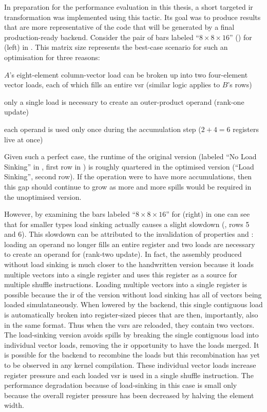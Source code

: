 \documentclass[\main/thesis.tex]{subfiles}
\begin{document}
In preparation for the performance evaluation in this thesis, a short targeted \gls{ir} transformation was implemented using this tactic.
Its goal was to produce results that are more representative of the code that will be generated by a final production-ready backend.
Consider the pair of bars labeled ``$8 \times 8 \times 16$'' () for  (left) in .
This matrix size represents the best-case scenario for such an optimisation for three reasons:
\begin{enumerate*}[itemjoin={{; }}, itemjoin*={{; and }}, label={\protect\circled{\arabic*}}, after={.}]
  \item $A$'s eight-element column-vector load can be broken up into two four-element vector loads, each of which fills an entire \gls{vsr} (similar logic applies to $B$'s rows)
  \item only a single load is necessary to create an outer-product operand (rank-one update)
  \item each operand is used only once during the accumulation step ($2+4=6$ registers \gls{live} at once)
\end{enumerate*}
Given such a perfect case, the runtime of the original version (labeled ``No Load Sinking'' in , first row in ) is roughly quartered in the optimised version (``Load Sinking'', second row).
If the operation were to have more accumulations, then this gap should continue to grow as more and more \glspl{spill} would be required in the unoptimised version.

However, by examining the bars labeled ``$8 \times 8 \times 16$'' for  (right) in  one can see that for smaller types load sinking actually causes a slight slowdown (, rows 5 and 6).
This slowdown can be attributed to the invalidation of properties  and : loading an  operand no longer fills an entire register and two loads are necessary to create an operand for  (rank-two update).
In fact, the assembly produced without load sinking is much closer to the handwritten version because it loads multiple vectors into a single register and uses this register as a source for multiple shuffle instructions.
Loading multiple vectors into a single register is possible because the \gls{ir} of the version without load sinking has all of vectors being loaded simulataneously.
When lowered by the backend, this single contiguous load is automatically broken into register-sized pieces that are then, importantly, also  in the same format.
Thus when the \glspl{vsr} are reloaded, they contain two  vectors.
The load-sinking version avoids \glspl{spill} by breaking the single contiguous load into individual vector loads, removing the \gls{ir} opportunity to have the loads merged.
It is possible for the backend to recombine the loads but this recombination has yet to be observed in any kernel compilation.
These individual vector loads increase register pressure and each loaded \gls{vsr} is used in a single shuffle instruction.
The performance degradation because of load-sinking in this case is small only because the overall register pressure has been decreased by halving the element width.
\end{document}
